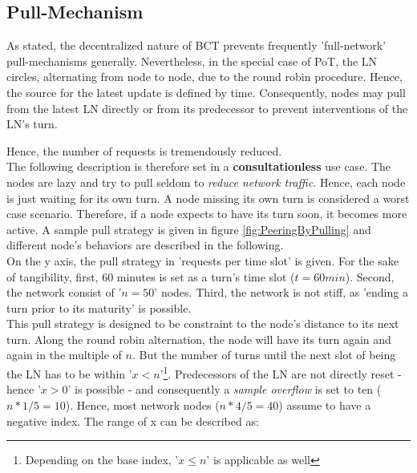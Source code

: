 \subsection{Pull-Mechanism} \label{def:PullMechanism}
As stated, the decentralized nature of \gls{BCT} prevents frequently 'full-network' pull-mechanisms generally.
Nevertheless, in the special case of \gls{PoT}, the \gls{LN} circles,
alternating from node to node, due to the round robin procedure.
Hence, the source for the latest update is defined by time.
Consequently, nodes may pull from the latest \gls{LN} directly or from its predecessor to prevent interventions of the \gls{LN}'s turn.
\begin{figure}[!b]
\end{figure}
Hence, the number of requests is tremendously reduced. \\
The following description is therefore set in a \textbf{consultationless} use case.
The nodes are lazy and try to pull seldom to \textit{reduce network traffic}.
Hence, each node is just waiting for its own turn.
A node missing its own turn is considered a worst case scenario.
Therefore, if a node expects to have its turn soon, it becomes more active.
A sample pull strategy is given in figure \ref{fig:PeeringByPulling} and different node's behaviors are described in the following. \\
On the y axis, the pull strategy in 'requests per time slot' is given.
For the sake of tangibility, first, 60 minutes is set as a turn's time slot ($t = 60 min$).
Second, the network consist of '$n=50$' nodes.
Third, the network is not stiff, as 'ending a turn prior to its maturity' is possible. \\	
This pull strategy is designed to be constraint to the node's distance to its next turn.
Along the round robin alternation, the node will have its turn again and again in the multiple of $n$.
But the number of turns until the next slot of being the \gls{LN} has to be within
'$x < n$'\footnote{\hspace{0.1cm}Depending on the base index, '$x \leq n$' is applicable as well}.
Predecessors of the \gls{LN} are not directly reset - hence '$x > 0$' is possible - and consequently a \textit{sample overflow} is set to ten ($n*1/5 = 10$).
Hence, most network nodes ($n*4/5 = 40$) assume to have a negative index.
The range of x can be described as:

